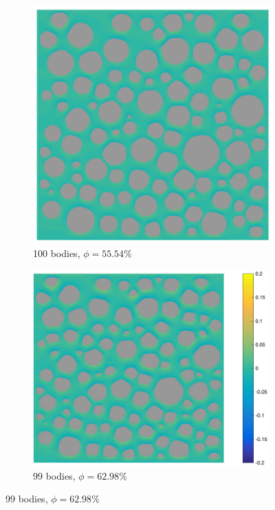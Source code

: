 \documentclass[preprint,10pt]{elsarticle}
\begin{document}
\begin{figure}[H]
 \begin{subfigure}[b]{0.5\textwidth}
\includegraphics*[width =0.9\linewidth]{./figs/100b_50}
\caption{100 bodies, $\phi = 55.54\%$}
\end{subfigure}%
\begin{subfigure}[b]{0.5\textwidth}
\includegraphics*[width =1.1\linewidth]{./figs/100b_100}
\caption{99 bodies, $\phi = 62.98\%$}
\end{subfigure}

\end{figure}
\end{document}
